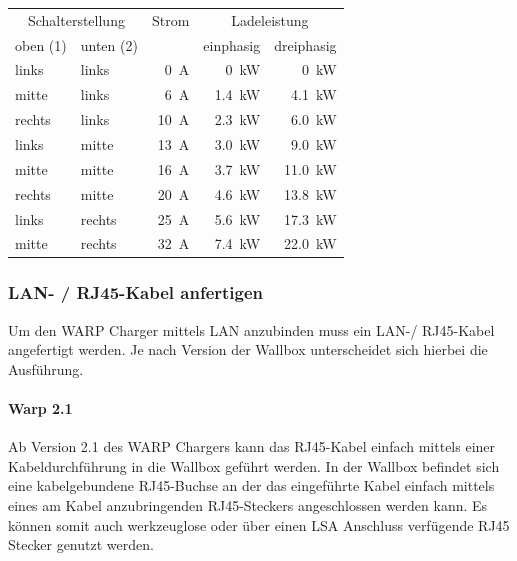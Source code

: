 \documentclass[a4paper,10pt]{article}
\begin{document}
\begin{multicols*}{2}
	\begin{tabular}{lp{}rrr}
		\toprule
		\multicolumn{2}{c}{Schalterstellung} & Strom            & \multicolumn{2}{c}{Ladeleistung}             \\
		\small{oben (1)} & \small{unten (2)} &                  & \small{einphasig}    & \small{dreiphasig}    \\
		\midrule
		links            & links             & \SI{0}{\ampere}  & \SI{0}{\kilo\watt}   & \SI{0}{\kilo\watt}    \\
		mitte            & links             & \SI{6}{\ampere}  & \SI{1.4}{\kilo\watt} & \SI{4.1}{\kilo\watt}  \\
		rechts           & links             & \SI{10}{\ampere} & \SI{2.3}{\kilo\watt} & \SI{6.0}{\kilo\watt}  \\
		links            & mitte             & \SI{13}{\ampere} & \SI{3.0}{\kilo\watt} & \SI{9.0}{\kilo\watt}  \\
		mitte            & mitte             & \SI{16}{\ampere} & \SI{3.7}{\kilo\watt} & \SI{11.0}{\kilo\watt} \\
		rechts           & mitte             & \SI{20}{\ampere} & \SI{4.6}{\kilo\watt} & \SI{13.8}{\kilo\watt} \\
		links            & rechts            & \SI{25}{\ampere} & \SI{5.6}{\kilo\watt} & \SI{17.3}{\kilo\watt} \\
		mitte            & rechts            & \SI{32}{\ampere} & \SI{7.4}{\kilo\watt} & \SI{22.0}{\kilo\watt} \\
		\bottomrule
	\end{tabular}

	\newpage
	\subsubsection{LAN- / RJ45-Kabel anfertigen}\label{ethernet}

	Um den WARP Charger mittels LAN anzubinden muss ein LAN-/ RJ45-Kabel
	angefertigt werden. Je nach Version der Wallbox unterscheidet sich hierbei
	die Ausführung.

	\paragraph{Warp 2.1}

	Ab Version 2.1 des WARP Chargers kann das RJ45-Kabel einfach mittels einer
	Kabeldurchführung in die Wallbox geführt werden. In der Wallbox befindet
	sich eine kabelgebundene RJ45-Buchse an der das eingeführte Kabel einfach
	mittels eines am Kabel anzubringenden RJ45-Steckers angeschlossen werden
	kann. Es können somit auch werkzeuglose oder über einen LSA Anschluss
	verfügende RJ45 Stecker genutzt werden.


\end{multicols*}
\end{document}
